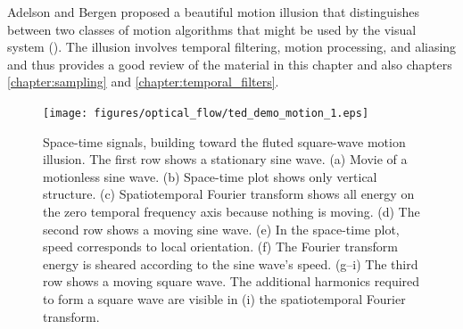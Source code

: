 
Adelson and Bergen proposed a beautiful motion illusion that distinguishes between two classes of motion algorithms that might be used by the visual system (\fig{\ref{fig:motionIllusion1}}).  The illusion involves temporal filtering, motion processing, and aliasing and thus provides a good review of the material in this chapter and also chapters \ref{chapter:sampling} and \ref{chapter:temporal_filters}.



\begin{figure}[t]
\centerline{
\texttt{[image: figures/optical\_flow/ted\_demo\_motion\_1.eps]}
} 
\caption{Space-time signals, building toward the fluted square-wave motion illusion. The first row shows a stationary sine wave. (a) Movie of a motionless sine wave. (b) Space-time plot shows only vertical structure. (c) Spatiotemporal Fourier transform shows all energy on the zero temporal frequency axis because nothing is moving. (d) The second row shows a moving sine wave. (e) In the space-time plot, speed corresponds to
local orientation. (f) The Fourier transform energy is sheared according to
the sine wave’s speed. (g–i) The third row shows a moving square wave. The additional harmonics required to form a square wave are visible in (i) the spatiotemporal Fourier transform.   
}
\label{fig:motionIllusion1}
\end{figure}


